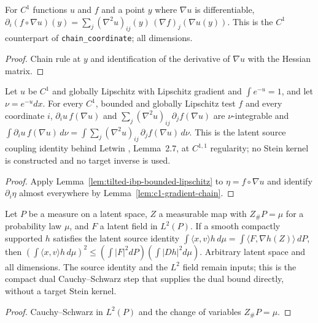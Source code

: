 \begin{lemma}
  \label{lem:c1-gradient-chain}
  \leanok
  For $C^1$ functions $u$ and $f$ and a point $y$ where $\nabla u$ is differentiable,
  $\partial_i(f\circ\nabla u)(y)=\sum_j(\nabla^2u)_{ij}(y)\,(\nabla f)_j(\nabla u(y))$. This is the $C^1$ counterpart of
  \texttt{chain\_coordinate}; all dimensions.
\end{lemma}
\begin{proof}
  \leanok
  Chain rule at $y$ and identification of the derivative of $\nabla u$ with the Hessian matrix.
\end{proof}

\begin{lemma}
  \label{lem:weak-source-stein-identity}
  \leanok
  Let $u$ be $C^1$ and globally Lipschitz with Lipschitz gradient and $\int e^{-u}=1$, and let $\nu=e^{-u}dx$. For every $C^1$, bounded and
  globally Lipschitz test $f$ and every coordinate $i$, $\partial_iu\,f(\nabla u)$ and $\sum_j(\nabla^2u)_{ij}\,\partial_jf(\nabla u)$ are
  $\nu$-integrable and $\int\partial_iu\,f(\nabla u)\,d\nu=\int\sum_j(\nabla^2u)_{ij}\,\partial_jf(\nabla u)\,d\nu$. This is the latent
  source coupling identity behind Letwin \cite{Letwin2026QuadraticKLS}, Lemma~2.7, at $C^{1,1}$ regularity; no Stein kernel is constructed
  and no target inverse is used.
\end{lemma}
\begin{proof}
  \leanok
  Apply Lemma~\ref{lem:tilted-ibp-bounded-lipschitz} to $\eta=f\circ\nabla u$ and identify $\partial_i\eta$ almost everywhere by
  Lemma~\ref{lem:c1-gradient-chain}.
\end{proof}

\begin{lemma}
  \label{lem:compact-source-dual-bound}
  \leanok
  Let $P$ be a measure on a latent space, $Z$ a measurable map with $Z_\#P=\mu$ for a probability law $\mu$, and $F$ a latent field in
  $L^2(P)$. If a smooth compactly supported $h$ satisfies the latent source identity
  $\int\langle x,v\rangle h\,d\mu=\int\langle F,\nabla h(Z)\rangle\,dP$, then
  $(\int\langle x,v\rangle h\,d\mu)^2\le(\int|F|^2dP)(\int|Dh|^2d\mu)$. Arbitrary latent space and all dimensions. The source identity and
  the $L^2$ field remain inputs; this is the compact dual Cauchy--Schwarz step that supplies the dual bound directly, without a target
  Stein kernel.
\end{lemma}
\begin{proof}
  \leanok
  Cauchy--Schwarz in $L^2(P)$ and the change of variables $Z_\#P=\mu$.
\end{proof}

